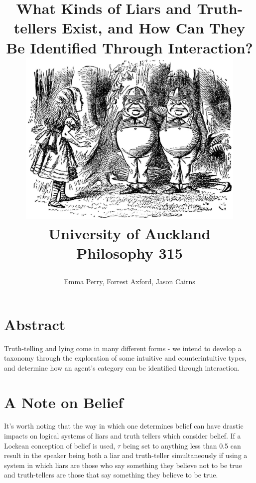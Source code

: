 \documentclass[12pt, titlepage, twoside]{report}
\title{
{What Kinds of Liars and Truth-tellers Exist, and How Can They Be Identified Through Interaction?} \newline \newline
{\includegraphics[width=11cm]{alice.eps}}\\
{\large University of Auckland}\\
{\large Philosophy 315}\\
\author{Emma Perry, Forrest Axford, Jason Cairns}}
\begin{document}
\maketitle
\tableofcontents
\newpage
\section*{Abstract}
Truth-telling and lying come in many different forms - we intend to develop a taxonomy through the exploration of some intuitive and counterintuitive types, and determine how an agent’s category can be identified through interaction.

\section*{A Note on Belief}
It’s worth noting that the way in which one determines belief can  have drastic impacts on logical systems of liars and truth tellers which consider belief.\cite{sep-logic-action} If a Lockean conception of belief is used, $\tau$ being set to anything less than 0.5 can result in the speaker being both a liar and truth-teller simultaneously if using a system in which liars are those who say something they believe not to be true and truth-tellers are those that say something they believe to be true.\cite{sep-logic-epistemic} 
\end{document}
